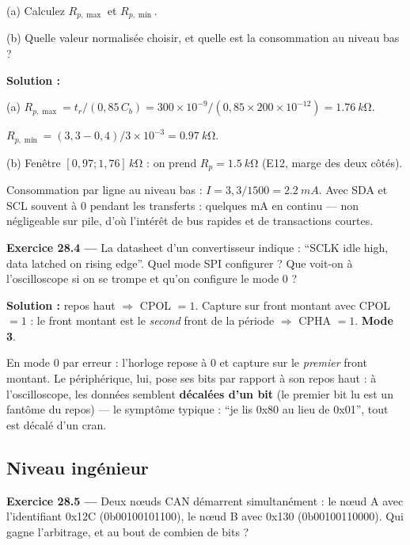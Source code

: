 \documentclass[12pt,a4paper,twoside]{book}
\begin{document}
(a) Calculez $R_{p,\max}$ et $R_{p,\min}$.

(b) Quelle valeur normalisée choisir, et quelle est la consommation au niveau bas ?

\begin{pratique}
\textbf{Solution :}

(a) $R_{p,\max} = t_r/(0{,}85\,C_b) = 300\times10^{-9}/(0{,}85\times200\times10^{-12}) = \SI{1.76}{k\ohm}$.

$R_{p,\min} = (3{,}3-0{,}4)/3\times10^{-3} = \SI{0.97}{k\ohm}$.

(b) Fenêtre $[0{,}97 ; 1{,}76]\,\si{k\ohm}$ : on prend $R_p = \SI{1.5}{k\ohm}$ (E12, marge des deux côtés).

Consommation par ligne au niveau bas : $I = 3{,}3/1500 = \SI{2.2}{mA}$. Avec SDA et SCL souvent à 0 pendant les transferts : quelques mA en continu --- non négligeable sur pile, d'où l'intérêt de bus rapides et de transactions courtes.
\end{pratique}

\textbf{Exercice 28.4 ---} La datasheet d'un convertisseur indique : ``SCLK idle high, data latched on rising edge''. Quel mode SPI configurer ? Que voit-on à l'oscilloscope si on se trompe et qu'on configure le mode 0 ?

\begin{pratique}
\textbf{Solution :} repos haut $\Rightarrow$ CPOL $= 1$. Capture sur front montant avec CPOL $=1$ : le front montant est le \textit{second} front de la période $\Rightarrow$ CPHA $= 1$. \textbf{Mode 3}.

En mode 0 par erreur : l'horloge repose à 0 et capture sur le \textit{premier} front montant. Le périphérique, lui, pose ses bits par rapport à son repos haut : à l'oscilloscope, les données semblent \textbf{décalées d'un bit} (le premier bit lu est un fantôme du repos) --- le symptôme typique : ``je lis 0x80 au lieu de 0x01'', tout est décalé d'un cran.
\end{pratique}

\subsection*{Niveau ingénieur}

\textbf{Exercice 28.5 ---} Deux nœuds CAN démarrent simultanément : le nœud A avec l'identifiant 0x12C (0b00100101100), le nœud B avec 0x130 (0b00100110000). Qui gagne l'arbitrage, et au bout de combien de bits ?
\end{document}
